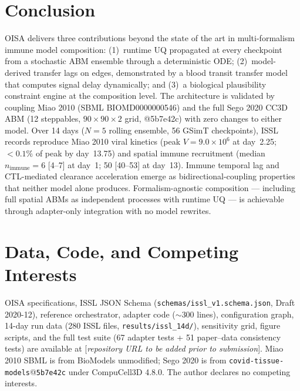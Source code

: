 \documentclass[conference,letterpaper,10pt]{IEEEtran}
\begin{document}
\section{Conclusion}
OISA delivers three contributions beyond the state of the art in
multi-formalism immune model composition: (1)~runtime UQ propagated at
every checkpoint from a stochastic ABM ensemble through a deterministic
ODE; (2)~model-derived transfer lags on edges, demonstrated by a blood
transit transfer model that computes signal delay dynamically; and
(3)~a biological plausibility constraint engine at the composition
level. The architecture is validated by coupling Miao 2010 (SBML
BIOMD0000000546) and the full Sego 2020 CC3D ABM
(12 steppables, $90{\times}90{\times}2$ grid, @5b7e42c) with zero
changes to either model. Over 14 days ($N\!=\!5$ rolling ensemble, 56
GSimT checkpoints), ISSL records reproduce Miao 2010 viral kinetics
(peak $V=9.0{\times}10^{6}$ at day~2.25; $<\!0.1\%$ of peak by
day~13.75) and spatial immune recruitment (median
$n_{\text{immune}}\!=\!6$ [4--7] at day~1; 50 [40--53] at day~13).
Immune temporal lag and CTL-mediated clearance acceleration emerge as
bidirectional-coupling properties that neither model alone produces.
Formalism-agnostic composition --- including full spatial ABMs as
independent processes with runtime UQ --- is achievable through
adapter-only integration with no model rewrites.

\section*{Data, Code, and Competing Interests}

OISA specifications, ISSL JSON Schema
(\texttt{schemas/issl\_v1.schema.json}, Draft 2020-12), reference
orchestrator, adapter code ($\sim$300 lines), configuration graph,
14-day run data (280 ISSL files, \texttt{results/issl\_14d/}),
sensitivity grid, figure scripts, and the full test suite (67 adapter
tests + 51 paper--data consistency tests) are available at
[\emph{repository URL to be added prior to submission}]. Miao 2010 SBML
is from BioModels unmodified; Sego 2020 is from
\texttt{covid-tissue-models}@\texttt{5b7e42c} under CompuCell3D 4.8.0.
The author declares no competing interests.

{\scriptsize


}
\end{document}
